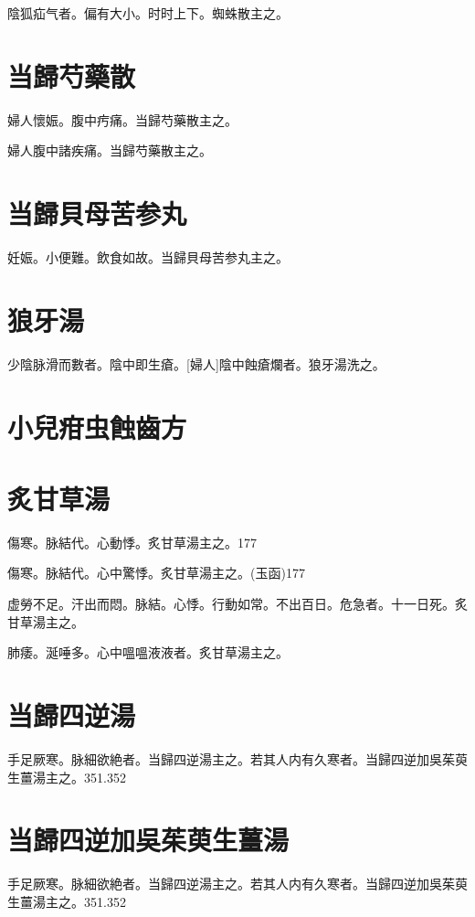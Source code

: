\documentclass[12pt,oneside,UTF8,b5paper]{ctexbook}她她她她她她她
\begin{document}
陰狐疝气者。偏有大小。时时上下。蜘蛛散主之。

\section{当歸芍藥散}

婦人懷娠。腹中㽲痛。当歸芍藥散主之。

婦人腹中諸疾痛。当歸芍藥散主之。

\section{当歸貝母苦参丸}

妊娠。小便難。飲食如故。当歸貝母苦参丸主之。

\section{狼牙湯}

少陰脉滑而數者。陰中即生瘡。[婦人]陰中蝕瘡爛者。狼牙湯洗之。

\section{小兒疳虫蝕齒方}

\section{炙甘草湯}

傷寒。脉結代。心動悸。炙甘草湯主之。177

傷寒。脉結代。心中驚悸。炙甘草湯主之。(玉函)177

虚勞不足。汗出而悶。脉結。心悸。行動如常。不出百日。危急者。十一日死。炙甘草湯主之。

肺痿。涎唾多。心中嗢嗢液液者。炙甘草湯主之。

\section{当歸四逆湯}

手足厥寒。脉細欲絶者。当歸四逆湯主之。若其人内有久寒者。当歸四逆加吳茱萸生薑湯主之。351.352

\section{当歸四逆加吳茱萸生薑湯}

手足厥寒。脉細欲絶者。当歸四逆湯主之。若其人内有久寒者。当歸四逆加吳茱萸生薑湯主之。351.352
\end{document}
